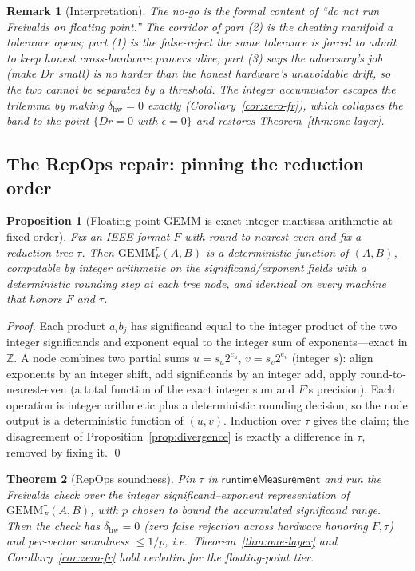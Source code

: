 \documentclass[11pt]{article}
\newtheorem{theorem}{Theorem}
\newtheorem{proposition}[theorem]{Proposition}
\newtheorem{remark}{Remark}
\newcommand{\Z}{\mathbb{Z}}
\newcommand{\GEMM}{\mathrm{GEMM}}
\newcommand{\runtime}{\mathsf{runtimeMeasurement}}
\begin{document}
\begin{remark}[Interpretation]
The no-go is the formal content of ``do not run Freivalds on floating point.'' The corridor of
part (2) is the cheating manifold a tolerance opens; part (1) is the false-reject the same
tolerance is forced to admit to keep honest cross-hardware provers alive; part (3) says the
adversary's job (make $Dr$ small) is no harder than the honest hardware's unavoidable drift,
so the two cannot be separated by a threshold. The integer accumulator escapes the trilemma by
making $\delta_{\mathrm{hw}} = 0$ \emph{exactly} (Corollary~\ref{cor:zero-fr}), which collapses
the band to the point $\{Dr = 0$ with $\epsilon = 0\}$ and restores Theorem~\ref{thm:one-layer}.
\end{remark}

\subsection{The RepOps repair: pinning the reduction order}

\begin{proposition}[Floating-point GEMM is exact integer-mantissa arithmetic at fixed order]
\label{prop:repops}
Fix an IEEE format $F$ with round-to-nearest-even and fix a reduction tree $\tau$. Then
$\GEMM_F^{\tau}(A,B)$ is a deterministic function of $(A,B)$, computable by integer arithmetic
on the significand/exponent fields with a deterministic rounding step at each tree node, and
identical on every machine that honors $F$ and $\tau$.
\end{proposition}

\begin{proof}
Each product $a_i b_j$ has significand equal to the integer product of the two integer
significands and exponent equal to the integer sum of exponents---exact in $\Z$. A node
combines two partial sums $u = s_u 2^{e_u}$, $v = s_v 2^{e_v}$ (integer $s$): align exponents
by an integer shift, add significands by an integer add, apply round-to-nearest-even (a total
function of the exact integer sum and $F$'s precision). Each operation is integer arithmetic
plus a deterministic rounding decision, so the node output is a deterministic function of
$(u,v)$. Induction over $\tau$ gives the claim; the disagreement of
Proposition~\ref{prop:divergence} is exactly a difference in $\tau$, removed by fixing it. \qed
\end{proof}

\begin{theorem}[RepOps soundness]
\label{thm:repops-sound}
Pin $\tau$ in $\runtime$ and run the Freivalds check over the integer significand--exponent
representation of $\GEMM_F^{\tau}(A,B)$, with $p$ chosen to bound the accumulated significand
range. Then the check has $\delta_{\mathrm{hw}} = 0$ (zero false rejection across hardware
honoring $F,\tau$) and per-vector soundness $\le 1/p$, i.e.\ Theorem~\ref{thm:one-layer} and
Corollary~\ref{cor:zero-fr} hold verbatim for the floating-point tier.
\end{theorem}
\end{document}
